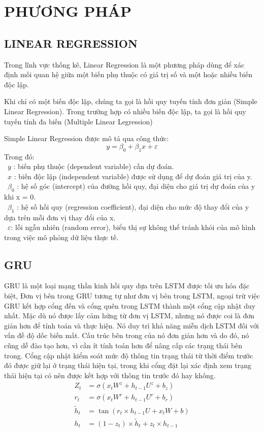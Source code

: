 \documentclass[conference]{IEEEtran}
\begin{document}
\section{PHƯƠNG PHÁP}
\subsection{LINEAR REGRESSION}
Trong lĩnh vực thống kê, Linear Regression là một phương pháp dùng để xác định mối quan hệ giữa một biến phụ thuộc có giá trị số và một hoặc nhiều biến độc lập.

Khi chỉ có một biến độc lập, chúng ta gọi là hồi quy tuyến tính đơn giản (Simple Linear Regression). Trong trường hợp có nhiều biến độc lập, ta gọi là hồi quy tuyến tính đa biến (Multiple Linear Legression)

Simple Linear Regression được mô tả qua công thức:
\[
 y = \beta_0 + \beta_1 x + \varepsilon
\]
Trong đó:\\
	\indent\textbullet\ \(y\) : biến phụ thuộc (dependent variable) cần dự đoán.\\
	\indent\textbullet\ \(x\) : biến độc lập (independent variable) được sử dụng để dự đoán giá trị của y.\\
        \indent\textbullet\ $\beta_0$ : hệ số góc (intercept) của đường hồi quy, đại diện cho giá trị dự đoán của y khi x = 0.\\
        \indent\textbullet\ $\beta_1$ : hệ số hồi quy (regression coefficient), đại diện cho mức độ thay đổi của y dựa trên mỗi đơn vị thay đổi của x.\\
        \indent\textbullet\ $\varepsilon$: lỗi ngẫu nhiên (random error), biểu thị sự không thể tránh khỏi của mô hình trong việc mô phỏng dữ liệu thực tế.
\subsection{GRU}
GRU là một loại mạng thần kinh hồi quy dựa trên LSTM được tối ưu hóa đặc biệt, Đơn vị bên trong GRU tương tự như đơn vị bên trong LSTM, ngoại trừ việc GRU kết hợp cổng đến và cổng quên trong LSTM thành một cổng cập nhật duy nhất.
Mặc dù nó được lấy cảm hứng từ đơn vị LSTM, nhưng nó được coi là đơn giản hơn để tính toán và thực hiện. Nó duy trì khả năng miễn dịch LSTM đối với vấn đề độ dốc biến mất. Cấu trúc bên trong của nó đơn giản hơn và do đó, nó cũng dễ đào tạo hơn, vì cần ít tính toán hơn để nâng cấp các trạng thái bên trong. Cổng cập nhật kiểm soát mức độ thông tin trạng thái từ thời điểm trước đó được giữ lại ở trạng thái hiện tại, trong khi cổng đặt lại xác định xem trạng thái hiện tại có nên được kết hợp với thông tin trước đó hay không.
\begin{align*}
Z_t &= \sigma(x_t W^z + h_{t-1} U^z + b_z) \\
r_t &= \sigma(x_t W^r + h_{t-1} U^r + b_r) \\
\tilde{h}_t &= \tan(r_t \times h_{t-1} U + x_t W + b) \\
h_t &= (1 - z_t) \times \tilde{h}_t + z_t \times h_{t-1}
\end{align*}
\end{document}
